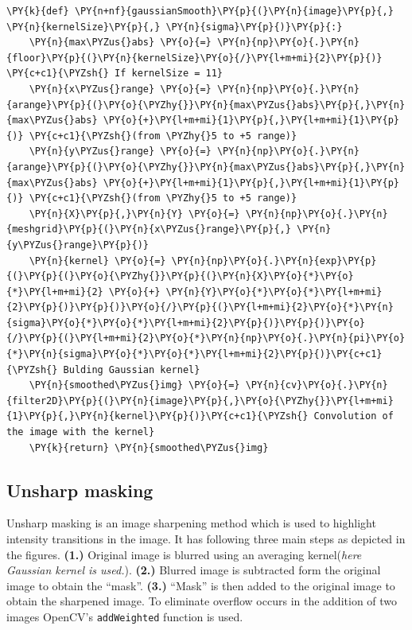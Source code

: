 \documentclass[a4paper,10pt]{article}%
\begin{document}
    \begin{tcolorbox}[breakable, size=fbox, boxrule=1pt, pad at break*=1mm,colback=cellbackground, colframe=cellborder]
\begin{Verbatim}[commandchars=\\\{\}]
\PY{k}{def} \PY{n+nf}{gaussianSmooth}\PY{p}{(}\PY{n}{image}\PY{p}{,} \PY{n}{kernelSize}\PY{p}{,} \PY{n}{sigma}\PY{p}{)}\PY{p}{:}
    \PY{n}{max\PYZus{}abs} \PY{o}{=} \PY{n}{np}\PY{o}{.}\PY{n}{floor}\PY{p}{(}\PY{n}{kernelSize}\PY{o}{/}\PY{l+m+mi}{2}\PY{p}{)} \PY{c+c1}{\PYZsh{} If kernelSize = 11}
    \PY{n}{x\PYZus{}range} \PY{o}{=} \PY{n}{np}\PY{o}{.}\PY{n}{arange}\PY{p}{(}\PY{o}{\PYZhy{}}\PY{n}{max\PYZus{}abs}\PY{p}{,}\PY{n}{max\PYZus{}abs} \PY{o}{+}\PY{l+m+mi}{1}\PY{p}{,}\PY{l+m+mi}{1}\PY{p}{)} \PY{c+c1}{\PYZsh{}(from \PYZhy{}5 to +5 range)}
    \PY{n}{y\PYZus{}range} \PY{o}{=} \PY{n}{np}\PY{o}{.}\PY{n}{arange}\PY{p}{(}\PY{o}{\PYZhy{}}\PY{n}{max\PYZus{}abs}\PY{p}{,}\PY{n}{max\PYZus{}abs} \PY{o}{+}\PY{l+m+mi}{1}\PY{p}{,}\PY{l+m+mi}{1}\PY{p}{)} \PY{c+c1}{\PYZsh{}(from \PYZhy{}5 to +5 range)}
    \PY{n}{X}\PY{p}{,}\PY{n}{Y} \PY{o}{=} \PY{n}{np}\PY{o}{.}\PY{n}{meshgrid}\PY{p}{(}\PY{n}{x\PYZus{}range}\PY{p}{,} \PY{n}{y\PYZus{}range}\PY{p}{)}
    \PY{n}{kernel} \PY{o}{=} \PY{n}{np}\PY{o}{.}\PY{n}{exp}\PY{p}{(}\PY{p}{(}\PY{o}{\PYZhy{}}\PY{p}{(}\PY{n}{X}\PY{o}{*}\PY{o}{*}\PY{l+m+mi}{2} \PY{o}{+} \PY{n}{Y}\PY{o}{*}\PY{o}{*}\PY{l+m+mi}{2}\PY{p}{)}\PY{p}{)}\PY{o}{/}\PY{p}{(}\PY{l+m+mi}{2}\PY{o}{*}\PY{n}{sigma}\PY{o}{*}\PY{o}{*}\PY{l+m+mi}{2}\PY{p}{)}\PY{p}{)}\PY{o}{/}\PY{p}{(}\PY{l+m+mi}{2}\PY{o}{*}\PY{n}{np}\PY{o}{.}\PY{n}{pi}\PY{o}{*}\PY{n}{sigma}\PY{o}{*}\PY{o}{*}\PY{l+m+mi}{2}\PY{p}{)}\PY{c+c1}{\PYZsh{} Bulding Gaussian kernel}
    \PY{n}{smoothed\PYZus{}img} \PY{o}{=} \PY{n}{cv}\PY{o}{.}\PY{n}{filter2D}\PY{p}{(}\PY{n}{image}\PY{p}{,}\PY{o}{\PYZhy{}}\PY{l+m+mi}{1}\PY{p}{,}\PY{n}{kernel}\PY{p}{)}\PY{c+c1}{\PYZsh{} Convolution of the image with the kernel}
    \PY{k}{return} \PY{n}{smoothed\PYZus{}img}
\end{Verbatim}
\end{tcolorbox}

\subsection{Unsharp masking}
Unsharp masking is an image sharpening method which is used to highlight intensity transitions in the image. It has following three main steps as depicted in the figures. \textbf{(1.)} Original image is blurred using an averaging kernel(\textit{here Gaussian kernel is used.}). \textbf{(2.)} Blurred image is subtracted form the original image to obtain the ``mask''. \textbf{(3.)} ``Mask'' is then added to the original image to obtain the sharpened image. To eliminate overflow occurs in the addition of two images OpenCV's {\tt addWeighted} function is used.
\end{document}
